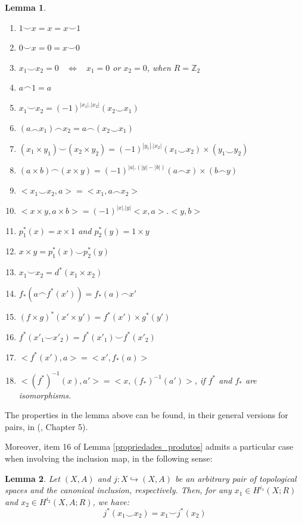 \documentclass[12pt,oneside]{book}
\newtheorem{lem}    {Lemma}[chapter]
\newcommand{\Z}{\mathbb{Z}}
\newcommand{\ccup}{\smile}
\newcommand{\ccap}{\frown}
\begin{document}
\begin{lem}
        \begin{enumerate}
            \item $1\ccup x=x=x\ccup 1$
            \item $0\ccup x=0=x\ccup 0$
            \item $x_{1}\ccup x_{2}=0$ \  $\Longleftrightarrow$ \ $x_{1}=0$ or $x_{2}=0$, when $R=\Z_{2}$
            \item $a\ccap 1=a$
            \item $x_{1}\ccup x_{2}=(-1)^{|x_{1}|.|x_{2}|}(x_{2}\ccup x_{1})$
            \item $(a\ccap x_{1})\ccap x_{2}=a\ccap (x_{2}\ccup x_{1})$
            \item $(x_{1}\times y_{1})\ccup (x_{2}\times y_{2})=(-1)^{|y_{1}|.|x_{2}|}(x_{1}\ccup x_{2})\times (y_{1}\ccup y_{2})$
            \item $(a\times b)\ccap (x\times y)=(-1)^{|a|.(|y|-|b|)}(a\ccap x)\times (b\ccap y)$
            \item $<x_{1}\ccup x_{2},a>=<x_{1},a\ccap x_{2}>$
            \item $<x\times y,a\times b>=(-1)^{|x|.|y|}<x,a>.<y,b>$
            \item $p_{1}^{*}(x)=x\times 1$ and $p_{2}^{*}(y)=1\times y$
            \item $x\times y=p_{1}^{*}(x)\ccup p_{2}^{*}(y)$
            \item $x_{1}\ccup x_{2}=d^{*}(x_{1}\times x_{2})$
            \item $f_{*}(a\ccap f^{*}(x'))=f_{*}(a)\ccap x'$
            \item $(f\times g)^{*}(x'\times y')=f^{*}(x')\times g^{*}(y')$
            \item $f^{*}(x'_{1}\ccup x'_{2})=f^{*}(x'_{1})\ccup f^{*}(x'_{2})$
            \item $<f^{*}(x'),a>=<x',f_{*}(a)>$
            \item $<(f^{*})^{-1}(x),a'>=<x,(f_{*})^{-1}(a')>$, if $f^{*}$ and $f_{*}$ are isomorphisms.
        \end{enumerate}
    \end{lem}
    
    The properties in the lemma above can be found, in their general versions for pairs, in 
    (\cite{spanier}, Chapter 5).
    
    Moreover, item 16 of Lemma \ref{propriedades_produtos} admits a particular case when involving the 
    inclusion map, in the following sense:
    
    \begin{lem}\label{propriedades_produtos_2}
        Let $(X,A)$ and $j:X\hookrightarrow (X,A)$ be an arbitrary pair of topological spaces and the 
        canonical inclusion, respectively. Then, for any $x_{1}\in H^{i_{1}}(X;R)$ and $x_{2}\in H^{i_{2}}(X,A;R)$, 
        we have:
        $$ j^{*}(x_{1}\ccup x_{2})=x_{1}\ccup j^{*}(x_{2}) $$
    \end{lem}
    
\end{document}
